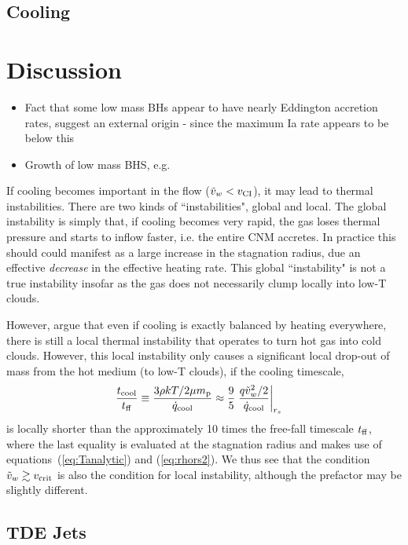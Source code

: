 \documentclass[usenatbib,fleqn]{mn2e}
\newcommand{\rs}{r_s}
\newcommand{\vw}{\tilde{v}_{w}}
\renewcommand{\mp}{m_{\rm p}}
\newcommand{\tcool}{t_{\rm cool}}
\newcommand{\tff}{t_{\rm ff}}
\begin{document}
\subsection{Cooling}
\label{sec:cooling}

\section{Discussion}

\begin{itemize}
\item{Fact that some low mass BHs appear to have nearly Eddington accretion rates, suggest an external origin - since the maximum Ia rate appears to be below this}
\item{Growth of low mass BHS, e.g. \citealt{Kauffmann&Heckman09}}
\end{itemize}

If cooling becomes important in the flow ($\tilde{v}_{w} < v_{\rm CI}$), it may lead to thermal instabilities.  There are two kinds of ``instabilities", global and local.  The global instability is simply that, if cooling becomes very rapid, the gas loses thermal pressure and starts to inflow faster, i.e. the entire CNM accretes.  In
practice this should could manifest as a large increase in the stagnation radius, due an effective {\it decrease} in the effective heating rate.  This global ``instability" is not a true instability insofar as the gas does not necessarily clump locally into low-T clouds.

However, \citet{McCourt+12} argue that even if cooling is exactly
balanced by heating everywhere, there is still a local thermal
instability that operates to turn hot gas into cold clouds.  However,
this local instability only causes a significant local drop-out of
mass from the hot medium (to low-T clouds), if the cooling timescale,
\begin{align}
\frac{\tcool}{\tff} &\equiv \frac{3\rho k T/2 \mu \mp}{\dot{q}_{\rm cool}} \approx \frac{9}{5} \left. \frac{q \vw^2/2}{\dot{q}_{\rm cool}}\right|_{\rs}
\end{align} 
is locally shorter than the approximately 10 times the free-fall
timescale $t_{\rm ff}$, where the last equality is evaluated at the
stagnation radius and makes use of equations~(\ref{eq:Tanalytic}) and
(\ref{eq:rhors2}).  We thus see that the condition $\tilde{v}_{w} \gtrsim v_{\rm
  crit}$ is also the condition for local instability, although the
prefactor may be slightly different.

\subsection{TDE Jets}
\end{document}
